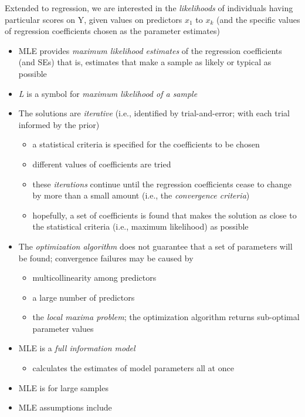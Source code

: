 \documentclass[
  11pt,
]{book}
\providecommand{\tightlist}{%
  \setlength{\itemsep}{0pt}\setlength{\parskip}{0pt}}
\begin{document}
Extended to regression, we are interested in the \emph{likelihoods} of individuals having particular scores on Y, given values on predictors \(x_{1}\) to \(x_{k}\) (and the specific values of regression coefficients chosen as the parameter estimates)

\begin{itemize}
\tightlist
\item
  MLE provides \emph{maximum likelihood estimates} of the regression coefficients (and SEs) that is, estimates that make a sample as likely or typical as possible
\item
  \emph{L} is a symbol for \emph{maximum likelihood of a sample}
\item
  The solutions are \emph{iterative} (i.e., identified by trial-and-error; with each trial informed by the prior)

  \begin{itemize}
  \tightlist
  \item
    a statistical criteria is specified for the coefficients to be chosen
  \item
    different values of coefficients are tried
  \item
    these \emph{iterations} continue until the regression coefficients cease to change by more than a small amount (i.e., the \emph{convergence criteria})
  \item
    hopefully, a set of coefficients is found that makes the solution as close to the statistical criteria (i.e., maximum likelihood) as possible
  \end{itemize}
\item
  The \emph{optimization algorithm} does not guarantee that a set of parameters will be found; convergence failures may be caused by

  \begin{itemize}
  \tightlist
  \item
    multicollinearity among predictors
  \item
    a large number of predictors
  \item
    the \emph{local maxima problem}; the optimization algorithm returns sub-optimal parameter values \citep{myung_tutorial_2003}
  \end{itemize}
\item
  MLE is a \emph{full information model}

  \begin{itemize}
  \tightlist
  \item
    calculates the estimates of model parameters all at once
  \end{itemize}
\item
  MLE is for large samples
\item
  MLE assumptions include


\end{itemize}
\end{document}
